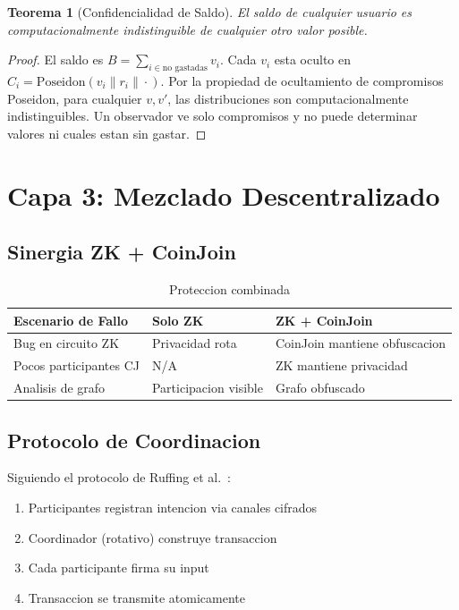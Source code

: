 \documentclass[11pt]{article}
\theoremstyle{definition}
\theoremstyle{plain}
\newtheorem{teorema}{Teorema}[section]
\theoremstyle{remark}
\begin{document}
\begin{teorema}[Confidencialidad de Saldo]
\label{thm:confidentiality}
El saldo de cualquier usuario es computacionalmente indistinguible de cualquier otro valor posible.
\end{teorema}

\begin{proof}
El saldo es $B = \sum_{i \in \text{no gastadas}} v_i$. Cada $v_i$ esta oculto en $C_i = \text{Poseidon}(v_i \| r_i \| \cdot)$. Por la propiedad de ocultamiento de compromisos Poseidon, para cualquier $v, v'$, las distribuciones son computacionalmente indistinguibles. Un observador ve solo compromisos y no puede determinar valores ni cuales estan sin gastar.
\end{proof}

\section{Capa 3: Mezclado Descentralizado}
\label{sec:layer3}

\subsection{Sinergia ZK + CoinJoin}

\begin{table}[H]
\centering
\caption{Proteccion combinada}
\label{tab:synergy}
\begin{tabular}{lll}
\toprule
\textbf{Escenario de Fallo} & \textbf{Solo ZK} & \textbf{ZK + CoinJoin} \\
\midrule
Bug en circuito ZK & Privacidad rota & CoinJoin mantiene obfuscacion \\
Pocos participantes CJ & N/A & ZK mantiene privacidad \\
Analisis de grafo & Participacion visible & Grafo obfuscado \\
\bottomrule
\end{tabular}
\end{table}

\subsection{Protocolo de Coordinacion}

Siguiendo el protocolo de Ruffing et al.~\cite{ruffing2014coinshuffle}:
\begin{enumerate}
    \item Participantes registran intencion via canales cifrados
    \item Coordinador (rotativo) construye transaccion
    \item Cada participante firma su input
    \item Transaccion se transmite atomicamente
\end{enumerate}
\end{document}
